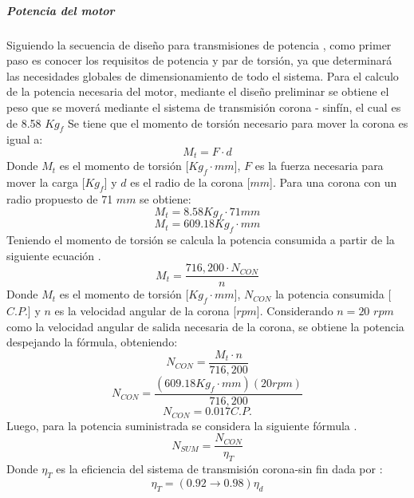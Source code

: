 \subparagraph{Potencia del motor}\hfill \break
Siguiendo la secuencia de diseño para transmisiones de potencia \cite{Shigley2012}, como primer paso es conocer los requisitos de potencia y par de torsión, ya que determinará las necesidades globales de dimensionamiento de todo el sistema.\hfill \break
Para el calculo de la potencia necesaria del motor, mediante el diseño preliminar se obtiene el peso que se moverá mediante el sistema de transmisión corona - sinfín, el cual es de 8.58 $Kg_f$\break
Se tiene que el momento de torsión \cite{Rodriguez2015} necesario para mover la corona es igual a:
\begin{equation}
    M_t = F\cdot d
\end{equation}
Donde $M_t$ es el momento de torsión [$Kg_f\cdot mm$], $F$ es la fuerza necesaria para mover la carga [$Kg_f$] y $d$ es el radio de la corona [$mm$].
Para una corona con un radio propuesto de 71 $mm$ se obtiene:
\begin{equation*}
    M_t = 8.58 Kg_f\cdot 71 mm
\end{equation*}
\begin{equation*}
    M_t = 609.18 Kg_f\cdot mm    
\end{equation*}
Teniendo el momento de torsión se calcula la potencia consumida a partir de la siguiente ecuación \cite{Rodriguez2015}.
\begin{equation}
    M_t = \frac{716,200\cdot N_{CON}}{n}
\end{equation}
Donde $M_t$ es el momento de torsión [$Kg_f\cdot mm$], $N_{CON}$ la potencia consumida [$C.P.$] y $n$ es la velocidad angular de la corona [$rpm$].
Considerando $n=20$ $rpm$ como la velocidad angular de salida necesaria de la corona, se obtiene la potencia despejando la fórmula, obteniendo:
\begin{equation*}
    N_{CON}=\frac{M_t\cdot n}{716,200}
\end{equation*}
\begin{equation*}
    N_{CON}=\frac{(609.18 Kg_f\cdot mm)(20rpm)}{716,200}
\end{equation*}
\begin{equation*}
    N_{CON}=0.017 C.P.
\end{equation*}
Luego, para la potencia suministrada se considera la siguiente fórmula \cite{Rodriguez2015}.
\begin{equation}\label{equ:PotenciaSUM}
    N_{SUM}=\frac{N_{CON}}{\eta_T}
\end{equation}
Donde $\eta_T$ es la eficiencia del sistema de transmisión corona-sin fin dada por \cite{Rodriguez2015}: 
\begin{equation}
    \eta_T=(0.92 \rightarrow 0.98)\eta_d
\end{equation}

